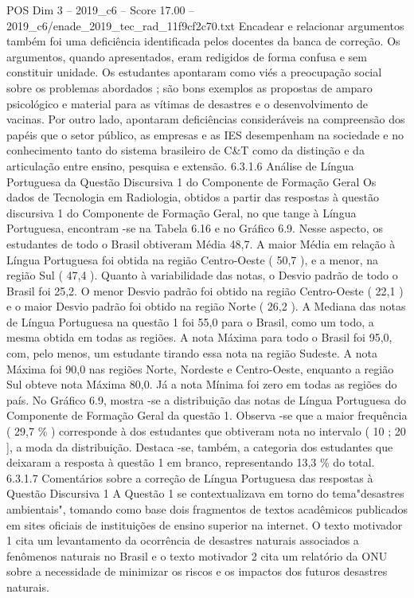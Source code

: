 \begin{textsample}{POS Dim 3 – 2019\_c6 – Score 17.00 – 2019\_c6/enade\_2019\_tec\_rad\_11f9cf2c70.txt}
Encadear e relacionar argumentos também foi uma deficiência identificada pelos docentes da banca de correção.
Os argumentos, quando apresentados, eram redigidos de forma confusa e sem constituir unidade.
Os estudantes apontaram como viés a preocupação social sobre os problemas abordados ; são bons exemplos as propostas de amparo psicológico e material para as vítimas de desastres e o desenvolvimento de vacinas.
Por outro lado, apontaram deficiências consideráveis na compreensão dos papéis que o setor público, as empresas e as IES desempenham na sociedade e no conhecimento tanto do sistema brasileiro de C\&T como da distinção e da articulação entre ensino, pesquisa e extensão. 6.3.1.6 Análise de Língua Portuguesa da Questão Discursiva 1 do Componente de Formação Geral Os dados de Tecnologia em Radiologia, obtidos a partir das respostas à questão discursiva 1 do Componente de Formação Geral, no que tange à Língua Portuguesa, encontram -se na Tabela 6.16 e no Gráfico 6.9.
Nesse aspecto, os estudantes de todo o Brasil obtiveram Média 48,7.
A maior Média em relação à Língua Portuguesa foi obtida na região Centro-Oeste ( 50,7 ), e a menor, na região Sul ( 47,4 ).
Quanto à variabilidade das notas, o Desvio padrão de todo o Brasil foi 25,2.
O menor Desvio padrão foi obtido na região Centro-Oeste ( 22,1 ) e o maior Desvio padrão foi obtido na região Norte ( 26,2 ).
A Mediana das notas de Língua Portuguesa na questão 1 foi 55,0 para o Brasil, como um todo, a mesma obtida em todas as regiões.
A nota Máxima para todo o Brasil foi 95,0, com, pelo menos, um estudante tirando essa nota na região Sudeste.
A nota Máxima foi 90,0 nas regiões Norte, Nordeste e Centro-Oeste, enquanto a região Sul obteve nota Máxima 80,0.
Já a nota Mínima foi zero em todas as regiões do país.
No Gráfico 6.9, mostra -se a distribuição das notas de Língua Portuguesa do Componente de Formação Geral da questão 1.
Observa -se que a maior frequência ( 29,7 \% ) corresponde à dos estudantes que obtiveram nota no intervalo ( 10 ; 20 ], a moda da distribuição.
Destaca -se, também, a categoria dos estudantes que deixaram a resposta à questão 1 em branco, representando 13,3 \% do total. 6.3.1.7 Comentários sobre a correção de Língua Portuguesa das respostas à Questão Discursiva 1 A Questão 1 se contextualizava em torno do tema"desastres ambientais", tomando como base dois fragmentos de textos acadêmicos publicados em sites oficiais de instituições de ensino superior na internet.
O texto motivador 1 cita um levantamento da ocorrência de desastres naturais associados a fenômenos naturais no Brasil e o texto motivador 2 cita um relatório da ONU sobre a necessidade de minimizar os riscos e os impactos dos futuros desastres naturais.

\end{textsample}

